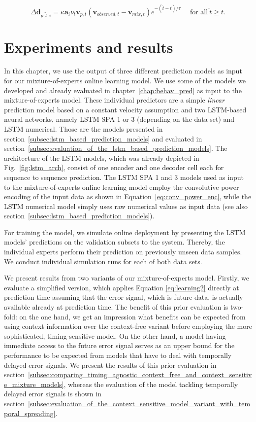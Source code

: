 \begin{equation}
    \Delta\mathbf{d}_{p, \tilde{t} ,i} = \kappa \mathbf{a}_i \nu_{t} \mathbf{v}_{p,t} (\mathbf{v}_{observed,t}-\mathbf{v}_{mix,t}) e^{-{( \tilde{t} - t)}/\tau} ~~~~~~ \textrm{for all}~ \tilde{t}  \geq t.
  \label{eq:learning3}
\end{equation}

\section{Experiments and results}%
\label{sec:experiments_and_results}

In this chapter, we use the output of three different prediction models as input for our mixture-of-experts online learning model.
We use some of the models we developed and already evaluated in chapter~\ref{chap:behav_pred} as input to the mixture-of-experts model.
These individual predictors are a simple \emph{linear} prediction model based on a constant velocity assumption and two \ac{LSTM}-based neural networks, namely \acs{LSTM} \acs{SPA} \num{1} or \num{3} (depending on the data set) and \acs{LSTM} numerical.
Those are the models presented in section~\ref{subsec:lstm_based_prediction_models} and evaluated in section~\ref{subsec:evaluation_of_the_lstm_based_prediction_models}.
The architecture of the \ac{LSTM} models, which was already depicted in Fig.~\ref{fig:lstm_arch}, consist of one encoder and one decoder cell each for sequence to sequence prediction.
The \acs{LSTM} \acs{SPA} \num{1} and \num{3} models used as input to the mixture-of-experts online learning model employ the convolutive power encoding of the input data as shown in Equation~\eqref{eq:conv_power_enc}, while the \acs{LSTM} numerical model simply uses raw numerical values as input data (see also section~\ref{subsec:lstm_based_prediction_models}). 

For training the model, we simulate online deployment by presenting the \ac{LSTM} models' predictions on the validation subsets to the system.
Thereby, the individual experts perform their prediction on previously unseen data samples.
We conduct individual simulation runs for each of both data sets.

We present results from two variants of our mixture-of-experts model.
Firstly, we evaluate a simplified version, which applies Equation \eqref{eq:learning2} directly at prediction time assuming that the error signal, which is future data, is actually available already at prediction time. 
The benefit of this prior evaluation is two-fold: on the one hand, we get an impression what benefits can be expected from using context information over the context-free variant before employing the more sophisticated, timing-sensitive model.
On the other hand, a model having immediate access to the future error signal serves as an upper bound for the performance to be expected from models that have to deal with temporally delayed error signals. 
We present the results of this prior evaluation in section~\ref{subsec:comparing_timing_agnostic_context_free_and_context_sensitive_mixture_models}, whereas the evaluation of the model tackling temporally delayed error signals is shown in section~\ref{subsec:evaluation_of_the_context_sensitive_model_variant_with_temporal_spreading}.

